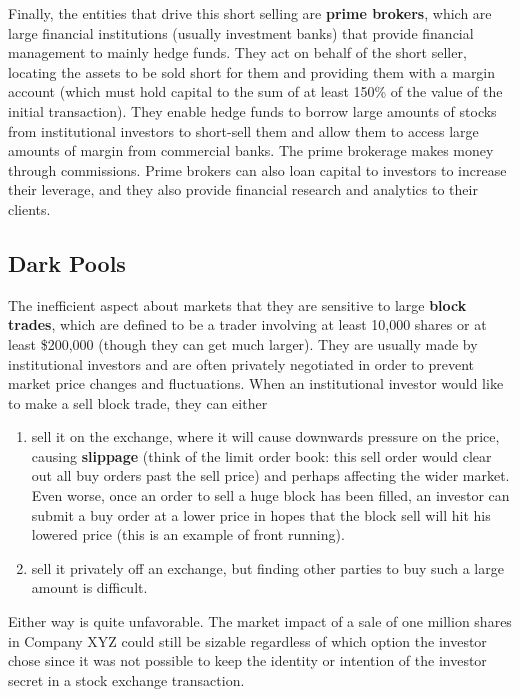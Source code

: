 \documentclass{article}
\begin{document}
    Finally, the entities that drive this short selling are \textbf{prime brokers}, which are large financial institutions (usually investment banks) that provide financial management to mainly hedge funds. They act on behalf of the short seller, locating the assets to be sold short for them and providing them with a margin account (which must hold capital to the sum of at least 150\% of the value of the initial transaction). They enable hedge funds to borrow large amounts of stocks from institutional investors to short-sell them and allow them to access large amounts of margin from commercial banks. The prime brokerage makes money through commissions. Prime brokers can also loan capital to investors to increase their leverage, and they also provide financial research and analytics to their clients. 

  \subsection{Dark Pools}

    The inefficient aspect about markets that they are sensitive to large \textbf{block trades}, which are defined to be a trader involving at least 10,000 shares or at least \$200,000 (though they can get much larger). They are usually made by institutional investors and are often privately negotiated in order to prevent market price changes and fluctuations. When an institutional investor would like to make a sell block trade, they can either 
    \begin{enumerate}
      \item sell it on the exchange, where it will cause downwards pressure on the price, causing \textbf{slippage} (think of the limit order book: this sell order would clear out all buy orders past the sell price) and perhaps affecting the wider market. Even worse, once an order to sell a huge block has been filled, an investor can submit a buy order at a lower price in hopes that the block sell will hit his lowered price (this is an example of front running). 
      \item sell it privately off an exchange, but finding other parties to buy such a large amount is difficult. 
    \end{enumerate}
    Either way is quite unfavorable. The market impact of a sale of one million shares in Company XYZ could still be sizable regardless of which option the investor chose since it was not possible to keep the identity or intention of the investor secret in a stock exchange transaction. 
\end{document}
